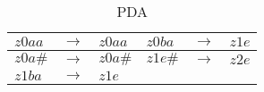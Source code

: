 \documentclass{article}
\begin{document}
\begin{table}[h!]
	\centering
	\caption{PDA}
	\begin{tabular}{|lcl|lcl|}
		\hline
		 $z0aa$ & $ \rightarrow $ & $z0aa$ & $z0ba$ & $ \rightarrow $ & $z1e$ \\
		\hline
		 $z0a\#$ & $ \rightarrow $ & $z0a\#$ & $z1e\#$ & $ \rightarrow $ & $z2e$ \\
		\hline
		 $z1ba$ & $ \rightarrow $ & $z1e$ & & &\\
		\hline
	\end{tabular}
\end{table}
\end{document}
